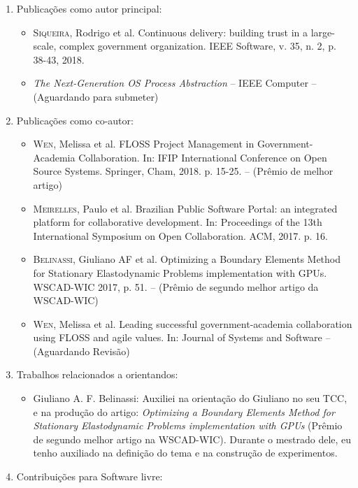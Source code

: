 \begin{enumerate}
  \item Publicações como autor principal:
    \begin{itemize}
      \item
      \textsc{Siqueira}, Rodrigo et al. Continuous delivery: building trust in a large-scale, complex government organization. IEEE Software, v. 35, n. 2, p. 38-43, 2018.
      \item \emph{The Next-Generation OS Process Abstraction} -- IEEE Computer -- (Aguardando para submeter)
    \end{itemize}

  \item Publicações como co-autor:
    \begin{itemize}
	\item
\textsc{Wen}, Melissa et al. FLOSS Project Management in Government-Academia Collaboration. In: IFIP International Conference on Open Source Systems. Springer, Cham, 2018. p. 15-25. -- (Prêmio de melhor artigo)
      \item 
\textsc{Meirelles}, Paulo et al. Brazilian Public Software Portal: an integrated platform for collaborative development. In: Proceedings of the 13th International Symposium on Open Collaboration. ACM, 2017. p. 16.
      \item
\textsc{Belinassi}, Giuliano AF et al. Optimizing a Boundary Elements Method for Stationary Elastodynamic Problems implementation with GPUs. WSCAD-WIC 2017, p. 51. -- (Prêmio de segundo melhor artigo da WSCAD-WIC)
      \item
\textsc{Wen}, Melissa et al. Leading successful government-academia collaboration using FLOSS and agile values. In: Journal of Systems and Software -- (Aguardando Revisão)
    \end{itemize}
  \item Trabalhos relacionados a orientandos:
    \begin{itemize}
      \item
Giuliano A. F. Belinassi: Auxiliei na orientação do Giuliano no seu TCC, e na
produção do artigo: \emph{Optimizing a Boundary Elements Method for Stationary
Elastodynamic Problems implementation with GPUs} (Prêmio de segundo melhor
artigo na WSCAD-WIC). Durante o mestrado dele, eu tenho auxiliado na definição
do tema e na construção de experimentos.
    \end{itemize}
  \item Contribuições para Software livre:
    \begin{itemize}

\end{itemize}
\end{enumerate}
